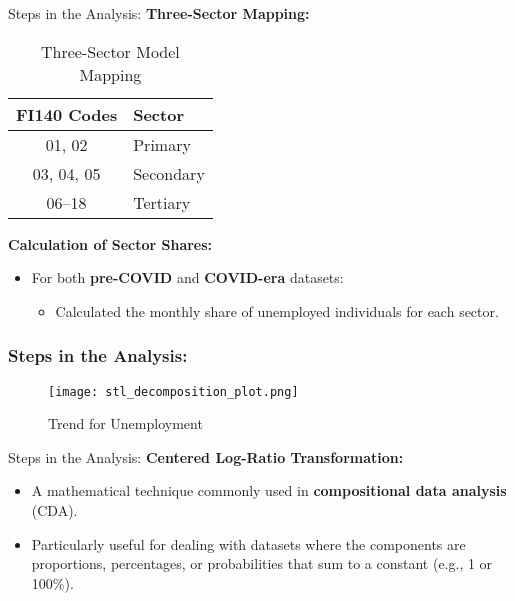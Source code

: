 \documentclass[
	11pt, %
]{beamer}
\begin{document}
\begin{frame}{Steps in the Analysis:}
    \textbf{Three-Sector Mapping:}
    \begin{table}[]
        \centering
        \begin{tabular}{|c|l|}
            \hline
            \textbf{FI140 Codes} & \textbf{Sector} \\ \hline
            01, 02              & Primary         \\ \hline
            03, 04, 05          & Secondary       \\ \hline
            06--18              & Tertiary        \\ \hline
        \end{tabular}
        \caption{Three-Sector Model Mapping}
        \label{tab:sector_mapping}
    \end{table}
    
    \vspace{0.5cm}
    \textbf{Calculation of Sector Shares:}
    \begin{itemize}
        \item For both \textbf{pre-COVID} and \textbf{COVID-era} datasets:
        \begin{itemize}
            \item Calculated the monthly share of unemployed individuals for each sector.
        \end{itemize}
    \end{itemize}
\end{frame}

\begin{frame}
    \frametitle{Steps in the Analysis:}
        \begin{figure}
        \centering
        \texttt{[image: stl\_decomposition\_plot.png]}
        \caption{Trend for Unemployment}
        \label{fig:trend_unemp}
    \end{figure}
\end{frame}



\begin{frame}{Steps in the Analysis:}
    \textbf{Centered Log-Ratio Transformation:}
    \begin{itemize}
        \item A mathematical technique commonly used in \textbf{compositional data analysis} (CDA).
        \item Particularly useful for dealing with datasets where the components are proportions, percentages, or probabilities that sum to a constant (e.g., 1 or 100\%).

    \end{itemize}

\end{frame}
\end{document}
